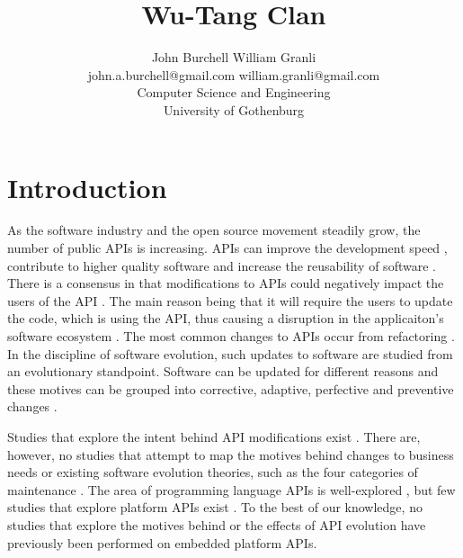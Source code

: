 \documentclass[10pt,twocolumn]{article}
\title{Wu-Tang Clan}
\begin{document}
\author{John Burchell \qquad William Granli \\
		john.a.burchell@gmail.com \qquad william.granli@gmail.com \\
		Computer Science and Engineering  \\
		University of Gothenburg }


\maketitle





\section{Introduction}
As the software industry and the open source movement steadily grow, the number of public APIs is increasing. APIs can improve the development speed \cite{stylos2006comparing}, contribute to higher quality software \cite{stylos2006comparing} and increase the reusability of software \cite{afonso2012evaluating}. There is a consensus in that modifications to APIs could negatively impact the users of the API \cite{google_talk} \cite{mcdonnell2013empirical} \cite{robbes2012developers} \cite{henning2007api} \cite{robbes2012developers}. The main reason being that it will require the users to update the code, which is using the API, thus causing a disruption in the applicaiton's software ecosystem \cite{messerschmitt2005software}. The most common changes to APIs occur from refactoring \cite{dig2005role} \cite{xing2006refactoring}. 
In the discipline of software evolution, such updates to software are studied from an evolutionary standpoint. Software can be updated for different reasons and these motives can be grouped into corrective, adaptive, perfective and preventive changes \cite{lientz1980software} \cite{iso}. 

Studies that explore the intent behind API modifications exist \cite{hou2011exploring}. There are, however, no studies that attempt to map the motives behind changes to business needs or existing software evolution theories, such as the four categories of maintenance \cite{lientz1980software} \cite{iso}. The area of programming language APIs is well-explored \cite{hou2011exploring} \cite{shi2011empirical}, but few studies that explore platform APIs exist \cite{robbes2012developers}. To the best of our knowledge, no studies that explore the motives behind or the effects of API evolution have previously been performed on embedded platform APIs. 
\end{document}
